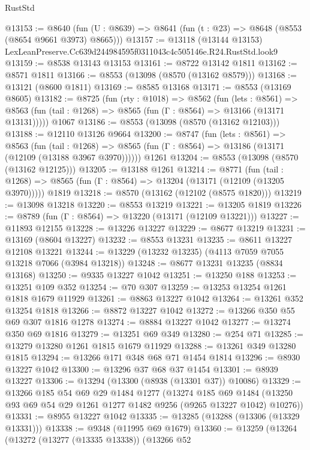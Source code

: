 \begin{lexlean}{RustStd}
\begin{coremodule}
@13153 := @8640
    (fun (U : @8639) => @8641 (fun (t : @23) => @8648 (@8553 (@8654 @9661 @3973) @8665)))
@13157 := @13118 (@13144 @13153) LexLeanPreserve.Cc639d244984595f0311043c4c505146e.R24.RustStd.look9
@13159 := @8538 @13143 @13153
@13161 := @8722 @13142 @1811
@13162 := @8571 @1811
@13166 := @8553 (@13098 (@8570 (@13162 @8579)))
@13168 := @13121 (@8600 @1811)
@13169 := @8585 @13168
@13171 := @8553 (@13169 @8605)
@13182 := @8725
    (fun (rty : @1018) =>
    @8562
      (fun (lets : @8561) =>
      @8563 (fun (tail : @1268) => @8565 (fun (Γ : @8564) => @13166 (@13171 @13131)))))
    @1067
@13186 := @8553 (@13098 (@8570 (@13162 @12103)))
@13188 := @12110 @13126 @9664
@13200 := @8747
    (fun (lets : @8561) =>
    @8563
      (fun (tail : @1268) =>
      @8565 (fun (Γ : @8564) => @13186 (@13171 (@12109 (@13188 @3967 @3970))))))
    @1261
@13204 := @8553 (@13098 (@8570 (@13162 @12125)))
@13205 := @13188 @1261
@13214 := @8771
    (fun (tail : @1268) => @8565 (fun (Γ : @8564) => @13204 (@13171 (@12109 (@13205 @3970)))))
    @1819
@13218 := @8570 (@13162 (@12102 (@8575 @1820)))
@13219 := @13098 @13218
@13220 := @8553 @13219
@13221 := @13205 @1819
@13226 := @8789 (fun (Γ : @8564) => @13220 (@13171 (@12109 @13221)))
@13227 := @11893 @12155
@13228 := @13226 @13227
@13229 := @8677 @13219
@13231 := @13169 (@8604 @13227)
@13232 := @8553 @13231
@13235 := @8611 @13227 @12108 @13221
@13244 := @13229 (@13232 @13235) (@4113 @7059 @7055 @13218 @7066 (@3984 @13218))
@13248 := @8677 @13231 @13235 (@8834 @13168)
@13250 := @9335 @13227 @1042
@13251 := @13250 @188
@13253 := @13251 @109 @352
@13254 := @70 @307
@13259 := @13253 @13254 @1261 @1818 @1679 @11929
@13261 := @8863 @13227 @1042
@13264 := @13261 @352 @13254 @1818
@13266 := @8872 @13227 @1042
@13272 := @13266 @350 @55 @69 @307 @1816 @1278
@13274 := @8884 @13227 @1042
@13277 := @13274 @350 @69 @1816
@13279 := @13251 @69 @349
@13280 := @254 @71
@13285 := @13279 @13280 @1261 @1815 @1679 @11929
@13288 := @13261 @349 @13280 @1815
@13294 := @13266 @171 @348 @68 @71 @1454 @1814
@13296 := @8930 @13227 @1042
@13300 := @13296 @37 @68 @37 @1454
@13301 := @8939 @13227
@13306 := @13294 (@13300 (@8938 (@13301 @37)) @10086)
@13329 := @13266
    @185
    @54
    @69
    @29
    @1484
    @1277
    (@13274
      @185
      @69
      @1484
      (@13250 @93 @69 @54 @29 @1261 @1277 @1482 @9256 (@9265 @13227 @1042) @10276))
@13331 := @8955 @13227 @1042
@13335 := @13285 (@13288 (@13306 (@13329 @13331)))
@13338 := @9348 (@11995 @69 @1679)
@13360 := @13259
    (@13264
      (@13272
        (@13277 (@13335 @13338))
        (@13266
          @52

\end{coremodule}
\end{lexlean}
